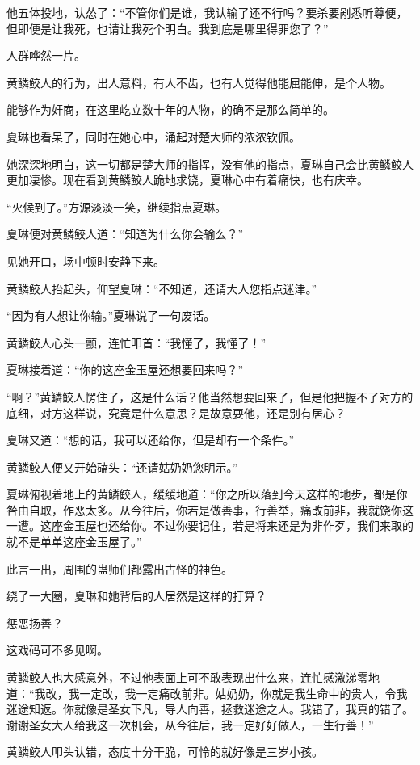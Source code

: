 \begin{this_body}
他五体投地，认怂了：“不管你们是谁，我认输了还不行吗？要杀要剐悉听尊便，但即便是让我死，也请让我死个明白。我到底是哪里得罪您了？”

人群哗然一片。

黄鳞鲛人的行为，出人意料，有人不齿，也有人觉得他能屈能伸，是个人物。

能够作为奸商，在这里屹立数十年的人物，的确不是那么简单的。

夏琳也看呆了，同时在她心中，涌起对楚大师的浓浓钦佩。

她深深地明白，这一切都是楚大师的指挥，没有他的指点，夏琳自己会比黄鳞鲛人更加凄惨。现在看到黄鳞鲛人跪地求饶，夏琳心中有着痛快，也有庆幸。

“火候到了。”方源淡淡一笑，继续指点夏琳。

夏琳便对黄鳞鲛人道：“知道为什么你会输么？”

见她开口，场中顿时安静下来。

黄鳞鲛人抬起头，仰望夏琳：“不知道，还请大人您指点迷津。”

“因为有人想让你输。”夏琳说了一句废话。

黄鳞鲛人心头一颤，连忙叩首：“我懂了，我懂了！”

夏琳接着道：“你的这座金玉屋还想要回来吗？”

“啊？”黄鳞鲛人愣住了，这是什么话？他当然想要回来了，但是他把握不了对方的底细，对方这样说，究竟是什么意思？是故意耍他，还是别有居心？

夏琳又道：“想的话，我可以还给你，但是却有一个条件。”

黄鳞鲛人便又开始磕头：“还请姑奶奶您明示。”

夏琳俯视着地上的黄鳞鲛人，缓缓地道：“你之所以落到今天这样的地步，都是你咎由自取，作恶太多。从今往后，你若是做善事，行善举，痛改前非，我就饶你这一遭。这座金玉屋也还给你。不过你要记住，若是将来还是为非作歹，我们来取的就不是单单这座金玉屋了。”

此言一出，周围的蛊师们都露出古怪的神色。

绕了一大圈，夏琳和她背后的人居然是这样的打算？

惩恶扬善？

这戏码可不多见啊。

黄鳞鲛人也大感意外，不过他表面上可不敢表现出什么来，连忙感激涕零地道：“我改，我一定改，我一定痛改前非。姑奶奶，你就是我生命中的贵人，令我迷途知返。你就像是圣女下凡，导人向善，拯救迷途之人。我错了，我真的错了。谢谢圣女大人给我这一次机会，从今往后，我一定好好做人，一生行善！”

黄鳞鲛人叩头认错，态度十分干脆，可怜的就好像是三岁小孩。


\end{this_body}
